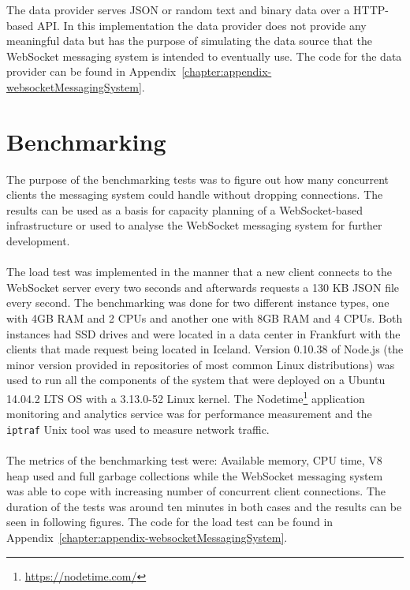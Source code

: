 The data provider serves JSON or random text and binary data over a HTTP-based API. In this implementation the data provider does not provide any meaningful data but has the purpose of simulating the data source that the WebSocket messaging system is intended to eventually use. The code for the data provider can be found in Appendix~\ref{chapter:appendix-websocketMessagingSystem}.

\section{Benchmarking}

The purpose of the benchmarking tests was to figure out how many concurrent clients the messaging system could handle without dropping connections. The results can be used as a basis for capacity planning of a WebSocket-based infrastructure or used to analyse the WebSocket messaging system for further development.
\\ \\
The load test was implemented in the manner that a new client connects to the WebSocket server every two seconds and afterwards requests a 130 KB JSON file every second. The benchmarking was done for two different instance types, one with 4GB RAM  and 2 CPUs and another one with 8GB RAM and 4 CPUs. Both instances had SSD drives and were located in a data center in Frankfurt with the clients that made request being located in Iceland. Version 0.10.38 of Node.js (the minor version provided in repositories of most common Linux distributions) was used to run all the components of the system that were deployed on a Ubuntu 14.04.2 LTS OS with a 3.13.0-52 Linux kernel. The Nodetime\footnote{\url{https://nodetime.com/}} application monitoring and analytics service was for performance measurement and the \texttt{iptraf} Unix tool was used to measure network traffic.
\\ \\
The metrics of the benchmarking test were: Available memory, CPU time, V8 heap used and full garbage collections while the WebSocket messaging system was able to cope with increasing number of concurrent client connections. The duration of the tests was around ten minutes in both cases and the results can be seen in following figures. The code for the load test can be found in Appendix~\ref{chapter:appendix-websocketMessagingSystem}.
\\
